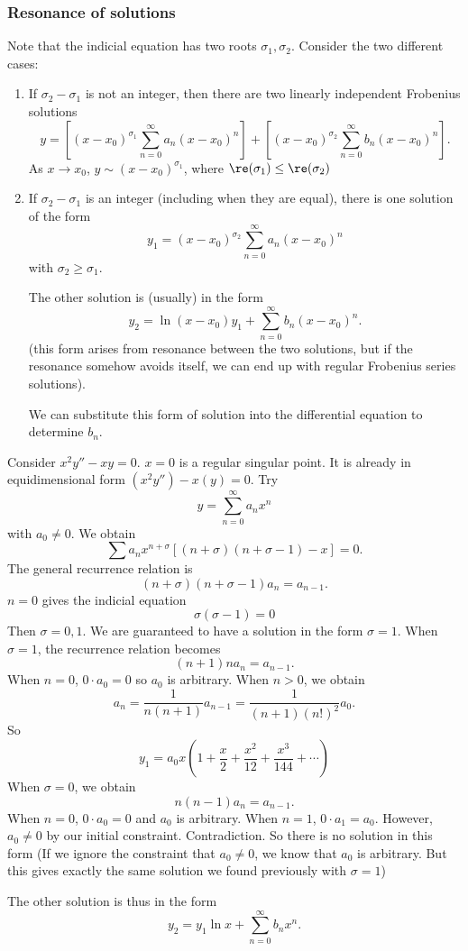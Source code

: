 \documentclass[a4paper]{article}
\begin{document}
  \subsubsection{Resonance of solutions}
  Note that the indicial equation has two roots $\sigma_1, \sigma_2$. Consider the two different cases:
  \begin{enumerate}
    \item If $\sigma_2 - \sigma_1$ is not an integer, then there are two linearly independent Frobenius solutions
      \[
        y = \left[(x - x_0)^{\sigma_1}\sum_{n = 0}^{\infty} a_n(x - x_0)^n\right] + \left[(x - x_0)^{\sigma_2}\sum_{n = 0}^{\infty} b_n(x - x_0)^n\right].
      \]
      As $x\to x_0$, $y \sim (x - x_0)^{\sigma_1}$, where $\re(\sigma_1) \leq \re(\sigma_2)$

    \item If $\sigma_2 - \sigma_1$ is an integer (including when they are equal), there is one solution of the form
      \[
        y_1 = (x - x_0)^{\sigma_2}\sum_{n = 0}^{\infty} a_n(x - x_0)^n
      \]
      with $\sigma_2 \geq \sigma_1$.

      The other solution is (usually) in the form
      \[
        y_2 = \ln(x - x_0)y_1 + \sum_{n = 0}^\infty b_n(x - x_0)^n.
      \]
      (this form arises from resonance between the two solutions, but if the resonance somehow avoids itself, we can end up with regular Frobenius series solutions).

      We can substitute this form of solution into the differential equation to determine $b_n$.

  \end{enumerate}
  \begin{eg}
    Consider $x^2 y'' - xy = 0$. $x = 0$ is a regular singular point. It is already in equidimensional form $(x^2y'') - x(y) = 0$. Try
    \[
      y = \sum_{n = 0}^\infty a_n x^n
    \]
    with $a_0 \not= 0$. We obtain
    \[
      \sum a_nx^{n + \sigma}[(n + \sigma)(n + \sigma - 1) - x] = 0.
    \]
    The general recurrence relation is
    \[
      (n + \sigma)(n + \sigma - 1)a_n = a_{n - 1}.
    \]
    $n = 0$ gives the indicial equation
    \[
      \sigma(\sigma - 1) = 0
    \]
    Then $\sigma = 0, 1$. We are guaranteed to have a solution in the form $\sigma = 1$. When $\sigma = 1$, the recurrence relation becomes
    \[
      (n + 1)n a_n = a_{n - 1}.
    \]
    When $n = 0$, $0\cdot a_0 = 0$ so $a_0$ is arbitrary.
    When $n > 0$, we obtain
    \[
      a_n = \frac{1}{n(n +1)}a_{n - 1} = \frac{1}{(n + 1)(n!)^2}a_0.
    \]
    So
    \[
      y_1 = a_0x\left(1 + \frac{x}{2} + \frac{x^2}{12} + \frac{x^3}{144} + \cdots \right)
    \]
    When $\sigma = 0$, we obtain 
    \[
      n(n - 1)a_n = a_{n - 1}.
    \]
    When $n = 0$, $0\cdot a_0 = 0$ and $a_0$ is arbitrary. When $n = 1$, $0\cdot a_1 = a_0$. However, $a_0\not= 0$ by our initial constraint. Contradiction. So there is no solution in this form (If we ignore the constraint that $a_0\not= 0$, we know that $a_0$ is arbitrary. But this gives exactly the same solution we found previously with $\sigma = 1$)

    The other solution is thus in the form 
    \[
      y_2 = y_1\ln x + \sum_{n = 0}^\infty b_nx^n.
    \]
  \end{eg}
\end{document}
